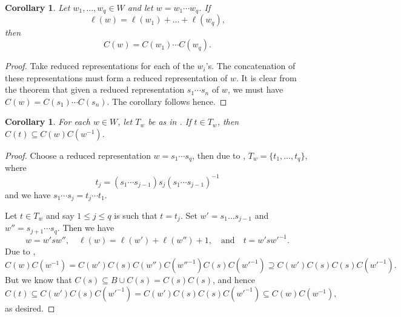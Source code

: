 \documentclass{article}
\theoremstyle{thmstyle}
\theoremstyle{defstyle}
\newtheorem{corollary}[theorem]{Corollary}
\renewcommand{\le}{\leqslant}
\begin{document}
\begin{corollary}
    Let $w_1,\dots,w_q\in W$ and let $w = w_1\cdots w_q$. If 
    \begin{equation*}
        \ell(w) = \ell(w_1) + \dots + \ell(w_q),
    \end{equation*}
    then 
    \begin{equation*}
        C(w) = C(w_1)\cdots C(w_q).
    \end{equation*}
\end{corollary}
\begin{proof}
    Take reduced representations for each of the $w_i$'s. The concatenation of these representations must form a reduced representation of $w$. It is clear from the theorem that given a reduced representation $s_1\cdots s_n$ of $w$, we must have $C(w) = C(s_1)\cdots C(s_n)$. The corollary follows hence.
\end{proof}

\begin{corollary}
    For each $w\in W$, let $T_w$ be as in . If $t\in T_w$, then $C(t)\subseteq C(w) C(w^{-1})$.
\end{corollary}
\begin{proof}
    Choose a reduced representation $w = s_1\cdots s_q$, then due to , $T_w = \{t_1,\dots,t_q\}$, where 
    \begin{equation*}
        t_j = (s_1\cdots s_{j - 1})s_j(s_1\cdots s_{j - 1})^{-1}
    \end{equation*}
    and we have $s_1\cdots s_j = t_j\cdots t_1$. 

    Let $t\in T_w$ and say $1\le j\le q$ is such that $t = t_j$. Set $w' = s_1\dots s_{j - 1}$ and $w'' = s_{j + 1}\cdots s_{q}$. Then we have 
    \begin{equation*}
        w = w'sw'',\quad \ell(w) = \ell(w') + \ell(w'') + 1,\quad\text{and}\quad t = w'sw'^{-1}.
    \end{equation*}
    Due to ,
    \begin{equation*}
        C(w)C(w^{-1}) = C(w')C(s)C(w'')C(w''^{-1})C(s)C(w'^{-1})\supseteq C(w')C(s)C(s)C(w'^{-1}).
    \end{equation*}
    But we know that $C(s)\subseteq B\cup C(s) = C(s)C(s)$, and hence 
    \begin{equation*}
        C(t)\subseteq C(w')C(s)C(w'^{-1}) = C(w')C(s)C(s)C(w'^{-1})\subseteq C(w)C(w^{-1}),
    \end{equation*}
    as desired.
\end{proof}
\end{document}
